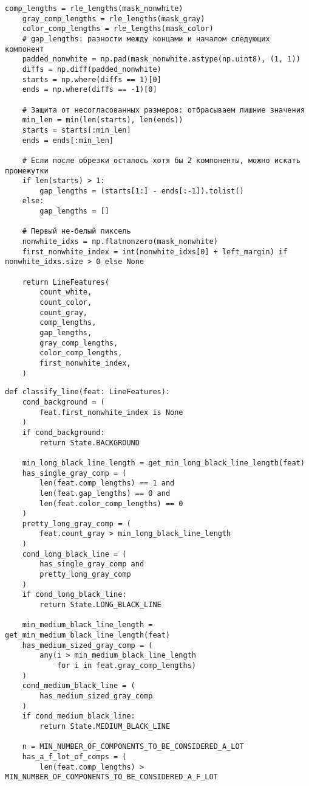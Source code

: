 \begin{lstlisting}[caption={Функция для выделения характеристик строки пикселей (часть 2)}, label={lst:}]
    comp_lengths = rle_lengths(mask_nonwhite)
    gray_comp_lengths = rle_lengths(mask_gray)
    color_comp_lengths = rle_lengths(mask_color)
    # gap_lengths: разности между концами и началом следующих компонент
    padded_nonwhite = np.pad(mask_nonwhite.astype(np.uint8), (1, 1))
    diffs = np.diff(padded_nonwhite)
    starts = np.where(diffs == 1)[0]
    ends = np.where(diffs == -1)[0]

    # Защита от несогласованных размеров: отбрасываем лишние значения
    min_len = min(len(starts), len(ends))
    starts = starts[:min_len]
    ends = ends[:min_len]

    # Если после обрезки осталось хотя бы 2 компоненты, можно искать промежутки
    if len(starts) > 1:
        gap_lengths = (starts[1:] - ends[:-1]).tolist()
    else:
        gap_lengths = []

    # Первый не-белый пиксель
    nonwhite_idxs = np.flatnonzero(mask_nonwhite)
    first_nonwhite_index = int(nonwhite_idxs[0] + left_margin) if nonwhite_idxs.size > 0 else None

    return LineFeatures(
        count_white,
        count_color,
        count_gray,
        comp_lengths,
        gap_lengths,
        gray_comp_lengths,
        color_comp_lengths,
        first_nonwhite_index,
    )
\end{lstlisting}

\newpage

\begin{lstlisting}[caption={Функция классификации строки (часть 1)}, label={lst:classify_line}]
def classify_line(feat: LineFeatures):
    cond_background = (
        feat.first_nonwhite_index is None
    )
    if cond_background:
        return State.BACKGROUND

    min_long_black_line_length = get_min_long_black_line_length(feat)
    has_single_gray_comp = (
        len(feat.comp_lengths) == 1 and
        len(feat.gap_lengths) == 0 and
        len(feat.color_comp_lengths) == 0
    )
    pretty_long_gray_comp = (
        feat.count_gray > min_long_black_line_length
    )
    cond_long_black_line = (
        has_single_gray_comp and
        pretty_long_gray_comp
    )
    if cond_long_black_line:
        return State.LONG_BLACK_LINE

    min_medium_black_line_length = get_min_medium_black_line_length(feat)
    has_medium_sized_gray_comp = (
        any(i > min_medium_black_line_length
            for i in feat.gray_comp_lengths)
    )
    cond_medium_black_line = (
        has_medium_sized_gray_comp
    )
    if cond_medium_black_line:
        return State.MEDIUM_BLACK_LINE

    n = MIN_NUMBER_OF_COMPONENTS_TO_BE_CONSIDERED_A_LOT
    has_a_f_lot_of_comps = (
        len(feat.comp_lengths) > MIN_NUMBER_OF_COMPONENTS_TO_BE_CONSIDERED_A_F_LOT
\end{lstlisting}


